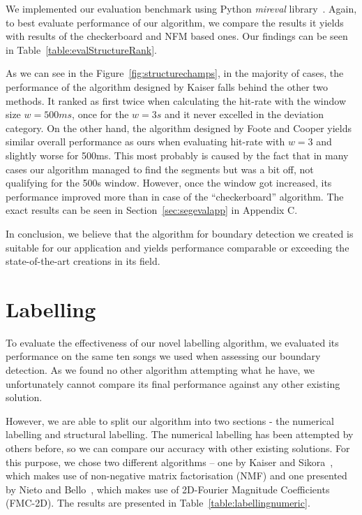 We implemented our evaluation benchmark using Python \textit{mir\textunderscore eval} library~\cite{mireval}.
Again, to best evaluate performance of our algorithm, we compare the results it yields with results of the checkerboard and NFM based ones. Our findings can be seen in Table~\ref{table:evalStructureRank}.


As we can see in the Figure~\ref{fig:structurechamps}, in the majority of cases, the performance of the algorithm designed by Kaiser falls behind the other two methods. It ranked as first twice when calculating the hit-rate with the window size $w=500ms$, once for the $w=3s$ and it never excelled in the deviation category. On the other hand, the algorithm designed by Foote and Cooper yields similar overall performance as ours when evaluating hit-rate with $w=3$ and slightly worse for 500ms. This most probably is caused by the fact that in many cases our algorithm managed to find the segments but was a bit off, not qualifying for the 500s window. However, once the window got increased, its performance improved more than in case of the ``checkerboard'' algorithm. The exact results can be seen in Section~\ref{sec:segevalapp} in Appendix C. 

In conclusion, we believe that the algorithm for boundary detection we created is suitable for our application and yields performance comparable or exceeding the state-of-the-art creations in its field. 

\vspace{20pt}

\section{Labelling}

To evaluate the effectiveness of our novel labelling algorithm, we evaluated its performance on the same ten songs we used when assessing our boundary detection. As we found no other algorithm attempting what he have, we unfortunately cannot compare its final performance against any other existing solution. 

However, we are able to split our algorithm into two sections - the numerical labelling and structural labelling. The numerical labelling has been attempted by others before, so we can compare our accuracy with other existing solutions. For this purpose, we chose two different algorithms -- one by Kaiser and Sikora~\cite{Sikora}, which makes use of non-negative matrix factorisation (NMF) and one presented by Nieto and Bello~\cite{Bello}, which makes use of  2D-Fourier Magnitude Coefficients (FMC-2D). The results are presented in Table~\ref{table:labellingnumeric}.


